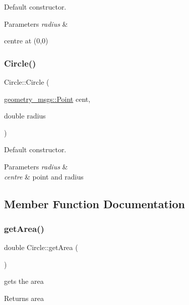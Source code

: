 Default constructor. 


\begin{DoxyParams}{Parameters}
{\em radius} & \\
\hline
\end{DoxyParams}
centre at (0,0) \mbox{\label{classCircle_ac02d550671d464b1fb82733933694f17}} 
\subsubsection{\texorpdfstring{Circle()}{Circle()}\hspace{0.1cm}{\footnotesize\ttfamily [3/3]}}
{\footnotesize\ttfamily Circle\+::\+Circle (\begin{DoxyParamCaption}\item[{\hyperlink{structgeometry__msgs_1_1Point}{geometry\+\_\+msgs\+::\+Point}}]{cent,  }\item[{double}]{radius }\end{DoxyParamCaption})}



Default constructor. 


\begin{DoxyParams}{Parameters}
{\em radius} & \\
\hline
{\em centre} & point and radius \\
\hline
\end{DoxyParams}


\subsection{Member Function Documentation}
\mbox{\label{classCircle_a99fe1cbabbf3a9ccae51832376c5e8d4}} 
\subsubsection{\texorpdfstring{get\+Area()}{getArea()}}
{\footnotesize\ttfamily double Circle\+::get\+Area (\begin{DoxyParamCaption}{ }\end{DoxyParamCaption})}



gets the area 

\begin{DoxyReturn}{Returns}
area 
\end{DoxyReturn}
\mbox{\label{classCircle_af9fccec77d3a15d63594666dc8501437}} 
